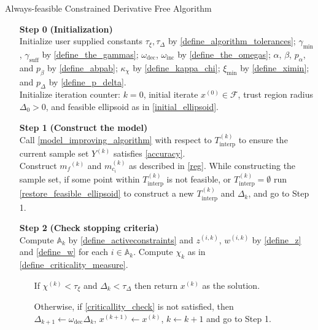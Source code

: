 \documentclass{article}
\theoremstyle{case}
\numberwithin{theorem}{subsection}
\newcommand{\activeconstraintsk}{{\mathbb A_{k}}}
\newcommand{\chik}{{\chi^{(k)}}}
\newcommand{\dk}{\Delta_k}
\newcommand{\feasible}{{\mathcal F}}
\newcommand{\gammabi}{\gamma_{\textrm{suff}}}
\newcommand{\gammasm}{\gamma_{\textrm{min}}}
\newcommand{\mcik}{{{m}^{(k)}_{c_i}}}
\newcommand{\mfk}{{{m}_f}^{(k)}}
\newcommand{\omegadec}{\omega_{\text{dec}}}
\newcommand{\omegainc}{\omega_{\text{inc}}}
\newcommand{\sampletrk}{{T_{\text{interp}}^{(k)}}}
\newcommand{\tolcrit}{\tau_{\xi}}
\newcommand{\tolrad}{\tau_{\Delta}}
\newcommand{\wik}{{w^{(i, k)}}}
\newcommand{\ximin}{\xi_{\text{min}}}
\newcommand{\xk}{x^{(k)}}
\newcommand{\xinit}{{x^{(0)}}}
\newcommand{\zik}{{z^{(i, k)}}}
\begin{document}
\begin{algorithm}[H]
    \caption{Always-feasible Constrained Derivative Free Algorithm}	
    \label{constrained_dfo}
    \begin{itemize}
        \item[\textbf{Step 0}] \textbf{(Initialization)} \\
        	Initialize user supplied constants $\tolcrit, \tolrad$ by \cref{define_algorithm_tolerances};
        	$\gammasm$, $\gammabi$ by \cref{define_the_gammas};
        	$\omegadec$, $\omegainc$ by \cref{define_the_omegas};
        	$\alpha$, $\beta$, $p_{\alpha}$, and $p_{\beta}$ by \cref{define_abpab};
			$\kappa_{\chi}$ by \cref{define_kappa_chi};
			$\ximin$ by \cref{define_ximin};
			and $p_{\Delta}$ by \cref{define_p_delta}. \\
        	Initialize iteration counter: $k=0$, initial iterate $\xinit \in \feasible$, trust region radius $\Delta_0 > 0$, and feasible ellipsoid as in \cref{initial_ellipsoid}.
            
        \item[\textbf{Step 1}] \textbf{(Construct the model)} \\
        Call \cref{model_improving_algorithm} with respect to $\sampletrk$ to ensure the current sample set $Y^{(k)}$ satisfies \cref{accuracy}. \\
        Construct $\mfk$ and $\mcik$ as described in \cref{reg}.
        While constructing the sample set, if some point within $\sampletrk$ is not feasible, or $\sampletrk = \emptyset$ 
        run \cref{restore_feasible_ellipsoid} to construct a new $\sampletrk$ and $\dk$, and go to Step 1.
        
        \item[\textbf{Step 2}] \textbf{(Check stopping criteria)} \\
        	Compute $\activeconstraintsk$ by \cref{define_activeconstraints} and $\zik$, $\wik$ by \cref{define_z} and \cref{define_w} for each $i \in \activeconstraintsk$.
            Compute $\chi_k$ as in \cref{define_criticality_measure}. \begin{itemize}
                \item[] If $ \chik < \tau_{\xi} $ and $\dk <\tau_{\Delta}$ then return $\xk$ as the solution.
                \item[] Otherwise, if \cref{criticallity_check} is not satisfied, then \\
                $\Delta_{k+1} \gets \omegadec\dk$, 
                $x^{(k+1)} \gets \xk$,
                $k \gets k+1$ and go to Step 1.
            \end{itemize}
            

\end{itemize}
\end{algorithm}
\end{document}
